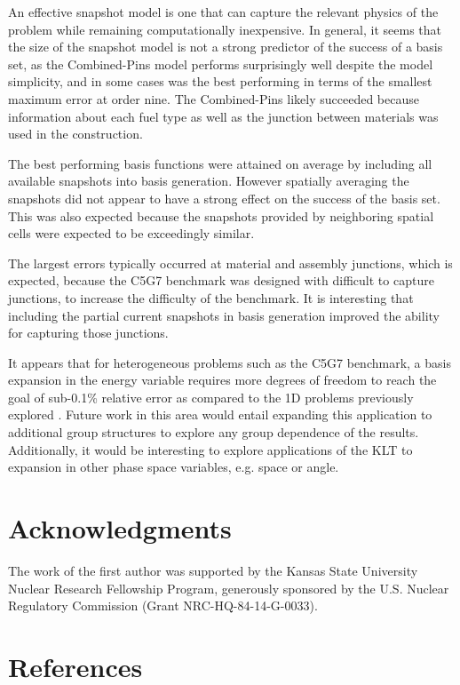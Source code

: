 \documentclass[5p,times,twocolumn,10pt]{elsarticle}
\begin{document}
An effective snapshot model is one that can capture the relevant physics of 
the problem while remaining computationally inexpensive.  
In general, it seems that the size of the snapshot model is not a strong 
predictor of the success of a basis set, as the Combined-Pins model performs 
surprisingly well despite the model simplicity, and in some cases was the best 
performing in terms of the smallest maximum error at order nine.
The Combined-Pins likely succeeded because information 
about each fuel type as well as the junction between materials was used in 
the construction.  

The best performing basis functions were attained 
on average by including all available snapshots into basis generation.  However 
spatially averaging the snapshots did not appear to have a strong effect on 
the success of the basis set.  This was also expected because the snapshots 
provided by neighboring spatial cells were expected to be exceedingly similar.

The largest errors typically occurred at material and assembly junctions, which is 
expected, because the C5G7 benchmark was designed with difficult to capture junctions, 
to increase the difficulty of the benchmark.  It is interesting that including 
the partial current snapshots in basis generation improved the ability for capturing those junctions.  

It appears that for heterogeneous problems such as the C5G7 benchmark, a basis 
expansion in the energy variable requires more degrees of freedom to reach the 
goal of sub-0.1\% relative error as compared to the 1D problems previously 
explored \cite{annualANS, reedThesis}.  Future work in this area would entail 
expanding this application to additional group structures to explore any
group dependence of the results.  Additionally, it would be interesting to explore 
applications of the KLT to expansion in other phase space variables, e.g. space or angle.

\section{Acknowledgments}
The work of the first author was supported by the Kansas State University 
Nuclear Research Fellowship Program, generously sponsored by the U.S. Nuclear 
Regulatory Commission (Grant NRC-HQ-84-14-G-0033).

\section{References}


\end{document}
